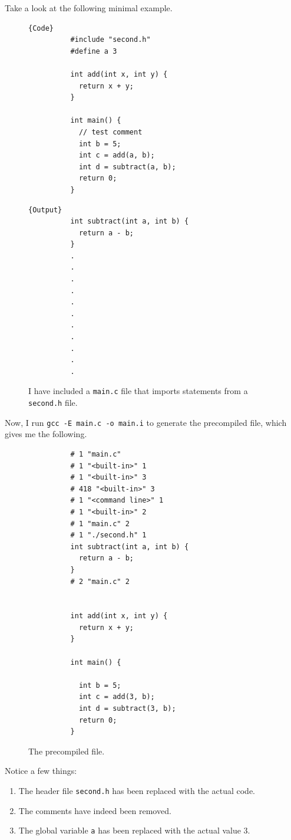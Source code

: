 \documentclass{article}
\begin{document}
    \begin{example}
      Take a look at the following minimal example. 
      \begin{figure}[H]
        \centering 
        \noindent\begin{minipage}{.5\textwidth}
        \begin{lstlisting}[]{Code}
          #include "second.h"
          #define a 3

          int add(int x, int y) {
            return x + y;
          }

          int main() {
            // test comment
            int b = 5; 
            int c = add(a, b);
            int d = subtract(a, b); 
            return 0; 
          }
        \end{lstlisting}
        \end{minipage}
        \hfill
        \begin{minipage}{.49\textwidth}
        \begin{lstlisting}[]{Output}
          int subtract(int a, int b) {
            return a - b; 
          }
          .
          .
          .
          .
          .
          .
          .
          .
          .
          .
          .
        \end{lstlisting}
        \end{minipage}
        \caption{I have included a \texttt{main.c} file that imports statements from a \texttt{second.h} file.} 
        \label{fig:precompile_example}
      \end{figure}
      Now, I run \texttt{gcc -E main.c -o main.i} to generate the precompiled file, which gives me the following. 
      \begin{figure}[H]
        \centering 
        \begin{lstlisting}
          # 1 "main.c"
          # 1 "<built-in>" 1
          # 1 "<built-in>" 3
          # 418 "<built-in>" 3
          # 1 "<command line>" 1
          # 1 "<built-in>" 2
          # 1 "main.c" 2
          # 1 "./second.h" 1
          int subtract(int a, int b) {
            return a - b;
          }
          # 2 "main.c" 2


          int add(int x, int y) {
            return x + y;
          }

          int main() {

            int b = 5;
            int c = add(3, b);
            int d = subtract(3, b);
            return 0;
          }
        \end{lstlisting}
        \caption{The precompiled file. } 
        \label{fig:precompiled_file}
      \end{figure}
      Notice a few things: 
      \begin{enumerate}
        \item The header file \texttt{second.h} has been replaced with the actual code.
        \item The comments have indeed been removed. 
        \item The global variable \texttt{a} has been replaced with the actual value 3. 
      \end{enumerate}
    \end{example}
\end{document}
